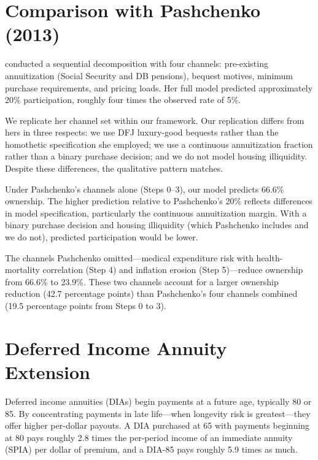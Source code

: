 \documentclass[12pt]{article}
\begin{document}
\section{Comparison with Pashchenko (2013)}
\label{app:pashchenko}

\citet{pashchenko2013} conducted a sequential decomposition with four channels: pre-existing annuitization (Social Security and DB pensions), bequest motives, minimum purchase requirements, and pricing loads. Her full model predicted approximately 20\% participation, roughly four times the observed rate of 5\%.

We replicate her channel set within our framework. Our replication differs from hers in three respects: we use DFJ luxury-good bequests rather than the homothetic specification she employed; we use a continuous annuitization fraction rather than a binary purchase decision; and we do not model housing illiquidity. Despite these differences, the qualitative pattern matches.



Under Pashchenko's channels alone (Steps 0--3), our model predicts 66.6\% ownership. The higher prediction relative to Pashchenko's 20\% reflects differences in model specification, particularly the continuous annuitization margin. With a binary purchase decision and housing illiquidity (which Pashchenko includes and we do not), predicted participation would be lower.

The channels Pashchenko omitted---medical expenditure risk with health-mortality correlation (Step 4) and inflation erosion (Step 5)---reduce ownership from 66.6\% to 23.9\%. These two channels account for a larger ownership reduction (42.7 percentage points) than Pashchenko's four channels combined (19.5 percentage points from Steps 0 to 3).


\section{Deferred Income Annuity Extension}
\label{app:dia}

Deferred income annuities (DIAs) begin payments at a future age, typically 80 or 85. By concentrating payments in late life---when longevity risk is greatest---they offer higher per-dollar payouts. A DIA purchased at 65 with payments beginning at 80 pays roughly 2.8 times the per-period income of an immediate annuity (SPIA) per dollar of premium, and a DIA-85 pays roughly 5.9 times as much.
\end{document}
